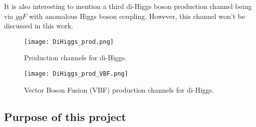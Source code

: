 \documentclass [12pt] {article}
\numberwithin{equation}{section} %
\numberwithin{figure}{section}   %
\begin{document}
It is also interesting to mention a third di-Higgs boson production channel being via $ggF$ with anomalous Higgs boson coupling. However, this channel won't be discussed in this work.



\begin{figure}[H]
    \centering
    \texttt{[image: DiHiggs\_prod.png]}
    \caption{Production channels for di-Higgs.}
    \label{prod_ggf}
\end{figure}

\begin{figure}[H]
    \centering
    \texttt{[image: DiHiggs\_prod\_VBF.png]}
    \caption{Vector Boson Fusion (VBF) production channels for di-Higgs.}
    \label{prod_VBF}
\end{figure}

\subsection{Purpose of this project}
\end{document}
